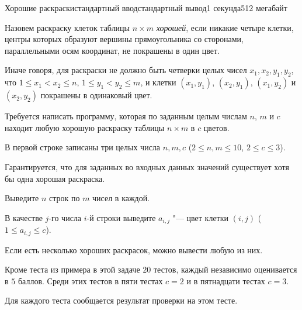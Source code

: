 \begin{problem}{Хорошие раскраски}{стандартный ввод}{стандартный вывод}{1 секунда}{512 мегабайт}

Назовем раскраску клеток таблицы $n \times m$ \textit{хорошей}, если никакие четыре клетки, центры которых образуют вершины прямоугольника со сторонами, параллельными осям координат, не покрашены в один цвет.

Иначе говоря, для раскраски не должно быть четверки целых чисел $x_1, x_2, y_1, y_2$, что $1 \leq x_1 < x_2 \leq n$, $1 \leq y_1 < y_2 \leq m$, и клетки $(x_1, y_1)$, $(x_2, y_1)$, $(x_1, y_2)$ и $(x_2, y_2)$ покрашены в одинаковый цвет.

Требуется написать программу, которая по заданным целым числам $n$, $m$ и $c$ находит любую хорошую раскраску таблицы $n \times m$ в $c$ цветов. 

\InputFile
В первой строке записаны три целых числа $n, m, c$ ($2 \leq n, m \leq 10$, $2 \leq c \leq 3$).

Гарантируется, что для заданных во входных данных значений существует хотя бы одна хорошая раскраска.

\OutputFile
Выведите $n$ строк по $m$ чисел в каждой. 

В качестве $j$-го числа $i$-й строки выведите $a_{i,j}$ "--- цвет клетки $(i,j)$ ($1 \leq a_{i,j} \leq c$).

Если есть несколько хороших раскрасок, можно вывести любую из них.

\Scoring
Кроме теста из примера в этой задаче $20$ тестов, каждый независимо оценивается в $5$ баллов. Среди этих тестов в пяти тестах $c = 2$ и в пятнадцати тестах $c = 3$.

Для каждого теста сообщается результат проверки на этом тесте.

\Example

\begin{example}
%
\end{example}

\end{problem}

